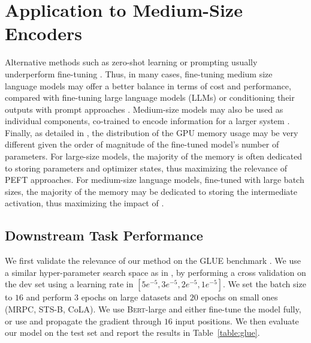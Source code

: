 \section{Application to Medium-Size Encoders}  \label{sec:exp:medium}

Alternative methods such as zero-shot learning or prompting usually underperform fine-tuning \citep{DBLP:conf/nips/BrownMRSKDNSSAA20}. Thus, in many cases, fine-tuning medium size language models may offer a better balance in terms of cost and performance, compared with fine-tuning large language models (LLMs) or conditioning their outputs with prompt approaches \citep{DBLP:conf/iclr/LiTLH22, DBLP:conf/naacl/SchickS21}. Medium-size models may also be used as individual components, co-trained to encode information for a larger system \citep{pfeiffer_23}. Finally, as detailed in , the distribution of the GPU memory usage may be very different given the order of magnitude of the fine-tuned model's number of parameters. For large-size models, the majority of the memory is often dedicated to storing parameters and optimizer states, thus maximizing the relevance of PEFT approaches. For medium-size language models, fine-tuned with large batch sizes, the majority of the memory may be dedicated to storing the intermediate activation, thus maximizing the impact of \method.
























\subsection{Downstream Task Performance}



We first validate the relevance of our method on the GLUE benchmark \citep{wang_18}. 
We use a similar hyper-parameter search space as in \citep{zaken_22}, by performing a cross validation on the dev set using a learning rate in $[5e^{-5}, 3e^{-5}, 2e^{-5}, 1e^{-5}]$. We set the batch size to $16$ and perform $3$ epochs on large datasets and $20$ epochs on small ones (MRPC, STS-B, CoLA). We use \textsc{Bert}-large \citep{devlin_19} and either fine-tune the model fully, or use \method and propagate the gradient through $16$ input positions. We then evaluate our model on the test set and report the results in Table~\ref{table:glue}.

